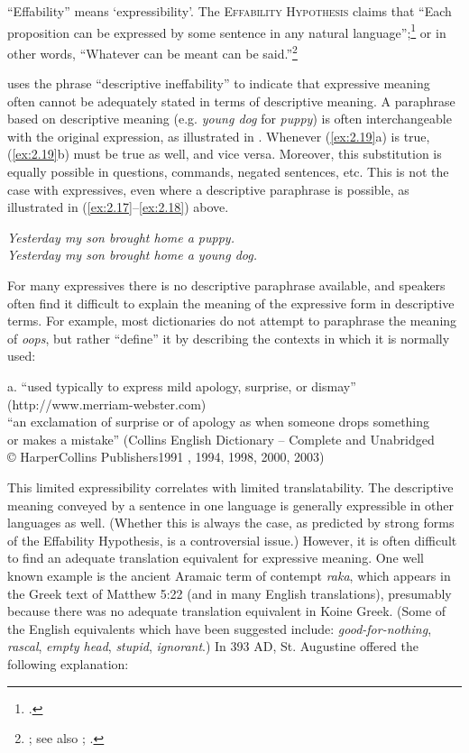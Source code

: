 “Effability” means ‘expressibility’. The \textsc{Effability} \textsc{Hypothesis} claims that “Each proposition can be expressed by some sentence in any natural language”;\footnote{\citet[209]{Katz1978}.} or in other words, “Whatever can be meant can be said.”\footnote{\citet[18]{Searle1969}; see also \citet[18-24]{Katz1972}; \citet[33]{Carston2002}.}



\citet{Potts2007c} uses the phrase “descriptive ineffability” to indicate that expressive meaning often cannot be adequately stated in terms of descriptive meaning. A paraphrase based on descriptive meaning (e.g. \textit{young dog} for \textit{puppy}) is often interchangeable with the original expression, as illustrated in . Whenever (\ref{ex:2.19}a) is true, (\ref{ex:2.19}b) must be true as well, and vice versa. Moreover, this substitution is equally possible in questions, commands, negated sentences, etc. This is not the case with expressives, even where a descriptive paraphrase is possible, as illustrated in (\ref{ex:2.17}--\ref{ex:2.18}) above.


\ea \label{ex:2.19}
\ea \textit{Yesterday my son brought home a puppy.}\\
\ex \textit{Yesterday my son brought home a young dog.}
                       \z
\z


For many expressives there is no descriptive paraphrase available, and speakers often find it difficult to explain the meaning of the expressive form in descriptive terms. For example, most dictionaries do not attempt to paraphrase the meaning of \textit{oops}, but rather “define” it by describing the contexts in which it is normally used:


\ea






  a. “used typically to express mild apology, surprise, or dismay”\\
  (http://www.merriam-webster.com)\\
\ex “an exclamation of surprise or of apology as when someone drops something\\
  or makes a mistake” (Collins English Dictionary – Complete and Unabridged\\
  © HarperCollins Publishers1991 , 1994, 1998, 2000, 2003)
\z


This limited expressibility correlates with limited translatability. The descriptive meaning conveyed by a sentence in one language is generally expressible in other languages as well. (Whether this is always the case, as predicted by strong forms of the Effability Hypothesis, is a controversial issue.) However, it is often difficult to find an adequate translation equivalent for expressive meaning. One well known example is the ancient Aramaic term of contempt \textit{raka}, which appears in the Greek text of Matthew 5:22 (and in many English translations), presumably because there was no adequate translation equivalent in Koine Greek. (Some of the English equivalents which have been suggested include: \textit{good-for-nothing}, \textit{rascal}, \textit{empty head}, \textit{stupid}, \textit{ignorant}.) In 393 AD, St. Augustine offered the following explanation:


